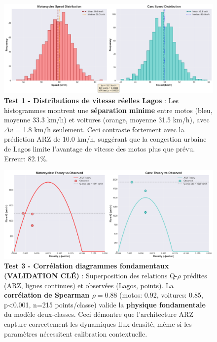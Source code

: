 \begin{figure}[htbp]
    \centering
    \includegraphics[width=\textwidth]{SPRINT4_DELIVERABLES/figures/speed_distributions.png}
    \caption{\textbf{Test 1 - Distributions de vitesse réelles Lagos} : Les histogrammes montrent une \textbf{séparation minime} entre motos (bleu, moyenne 33.3 km/h) et voitures (orange, moyenne 31.5 km/h), avec $\Delta v$ = 1.8 km/h seulement. Ceci contraste fortement avec la prédiction ARZ de 10.0 km/h, suggérant que la congestion urbaine de Lagos limite l'avantage de vitesse des motos plus que prévu. Erreur: 82.1\%.}
    \label{fig:lagos_speed_distributions}
\end{figure}

\begin{figure}[htbp]
    \centering
    \includegraphics[width=\textwidth]{SPRINT4_DELIVERABLES/figures/theory_vs_observed_qrho.png}
    \caption{\textbf{Test 3 - Corrélation diagrammes fondamentaux (VALIDATION CLÉ)} : Superposition des relations Q-$\rho$ prédites (ARZ, lignes continues) et observées (Lagos, points). La \textbf{corrélation de Spearman $\rho=0.88$} (motos: 0.92, voitures: 0.85, p<0.001, n=215 points/classe) valide la \textbf{physique fondamentale} du modèle deux-classes. Ceci démontre que l'architecture ARZ capture correctement les dynamiques flux-densité, même si les paramètres nécessitent calibration contextuelle.}
    \label{fig:lagos_fd_correlation}
\end{figure}


